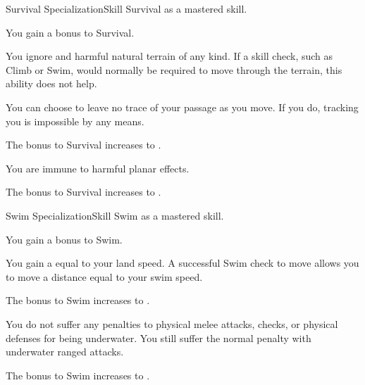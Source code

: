     \begin{feat}{Survival Specialization}{Skill}
        \featpre Survival as a mastered skill.
        \featben

         You gain a  bonus to Survival.

         You ignore  and harmful natural terrain of any kind.
        If a skill check, such as Climb or Swim, would normally be required to move through the terrain, this ability does not help.

         You can choose to leave no trace of your passage as you move.
        If you do, tracking you is impossible by any  means.

         The bonus to Survival increases to .

         You are immune to harmful planar effects.

         The bonus to Survival increases to .
    \end{feat}

    \begin{feat}{Swim Specialization}{Skill}
        \featpre Swim as a mastered skill.
        \featben

         You gain a  bonus to Swim.

        \ff[2]{}

         You gain a  equal to your land speed.
        A successful Swim check to move allows you to move a distance equal to your swim speed.

         The bonus to Swim increases to .

         You do not suffer any penalties to physical melee attacks, checks, or physical defenses for being underwater.
        You still suffer the normal penalty with underwater ranged attacks.

         The bonus to Swim increases to .
    \end{feat}


